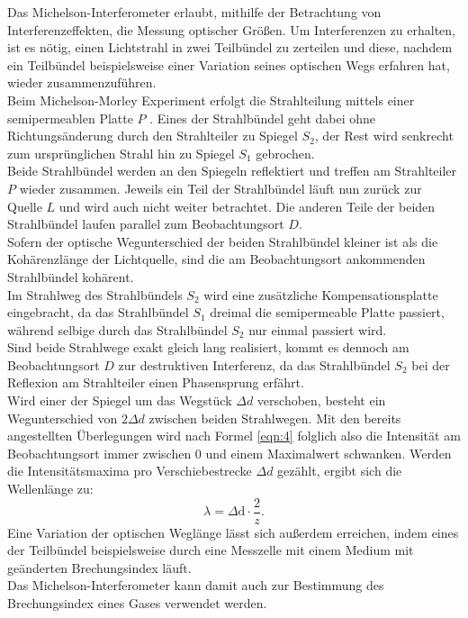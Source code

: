Das Michelson-Interferometer erlaubt, mithilfe der Betrachtung von Interferenzeffekten, die Messung optischer Größen.
Um Interferenzen zu erhalten, ist es nötig, einen Lichtstrahl in zwei Teilbündel zu zerteilen und diese, nachdem ein Teilbündel beispielsweise einer Variation seines optischen Wegs erfahren hat, wieder zusammenzuführen.\\
Beim Michelson-Morley Experiment erfolgt die Strahlteilung mittels einer semipermeablen Platte $P$ .
Eines der Strahlbündel geht dabei ohne Richtungsänderung durch den Strahlteiler zu Spiegel $S_2$, der Rest wird senkrecht zum ursprünglichen Strahl hin zu Spiegel $S_1$ gebrochen.\\
Beide Strahlbündel werden an den Spiegeln reflektiert und treffen am Strahlteiler $P$ wieder zusammen. Jeweils ein Teil der Strahlbündel läuft nun zurück zur Quelle $L$ und wird auch nicht weiter betrachtet. Die anderen Teile der beiden Strahlbündel laufen parallel zum Beobachtungsort $D$.\\
Sofern der optische Wegunterschied der beiden Strahlbündel kleiner ist als die Kohärenzlänge der Lichtquelle, sind die am Beobachtungsort ankommenden Strahlbündel kohärent.\\
Im Strahlweg des Strahlbündels $S_2$ wird eine zusätzliche Kompensationsplatte eingebracht, da das Strahlbündel $S_1$ dreimal die semipermeable Platte passiert, während selbige durch das Strahlbündel $S_2$ nur einmal passiert wird.\\
Sind beide Strahlwege exakt gleich lang realisiert, kommt es dennoch am Beobachtungsort $D$ zur destruktiven Interferenz, da das Strahlbündel $S_2$ bei der Reflexion am Strahlteiler einen Phasensprung erfährt.\\
Wird einer der Spiegel um das Wegstück $\Delta d$ verschoben, besteht ein Wegunterschied von $2\Delta d$ zwischen beiden Strahlwegen.
Mit den bereits angestellten Überlegungen wird nach Formel \eqref{eqn:4} folglich also die Intensität am Beobachtungsort immer zwischen 0 und einem Maximalwert schwanken.
Werden die Intensitätsmaxima pro Verschiebestrecke $\Delta d$ gezählt, ergibt sich die Wellenlänge zu:
\begin{equation}
	\label{eqn:lambda}
	\lambda= \Delta\text{d}\cdot \frac{2}{z} \text{.}
\end{equation}
Eine Variation der optischen Weglänge lässt sich außerdem erreichen, indem eines der Teilbündel beispielsweise durch eine Messzelle mit einem Medium mit geänderten Brechungsindex läuft.\\
Das Michelson-Interferometer kann damit auch zur Bestimmung des Brechungsindex eines Gases verwendet werden.
